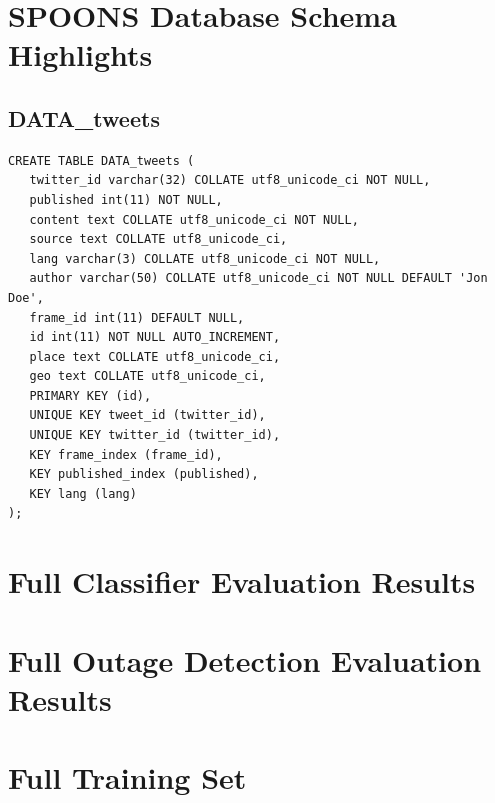 \documentclass[12pt]{ucthesis}
\begin{document}

\appendix
\chapter{SPOONS Database Schema Highlights}
\label{appendix-db-schema}

\section{DATA\_tweets}
\begin{lstlisting}
CREATE TABLE DATA_tweets (
   twitter_id varchar(32) COLLATE utf8_unicode_ci NOT NULL,
   published int(11) NOT NULL,
   content text COLLATE utf8_unicode_ci NOT NULL,
   source text COLLATE utf8_unicode_ci,
   lang varchar(3) COLLATE utf8_unicode_ci NOT NULL,
   author varchar(50) COLLATE utf8_unicode_ci NOT NULL DEFAULT 'Jon Doe',
   frame_id int(11) DEFAULT NULL,
   id int(11) NOT NULL AUTO_INCREMENT,
   place text COLLATE utf8_unicode_ci,
   geo text COLLATE utf8_unicode_ci,
   PRIMARY KEY (id),
   UNIQUE KEY tweet_id (twitter_id),
   UNIQUE KEY twitter_id (twitter_id),
   KEY frame_index (frame_id),
   KEY published_index (published),
   KEY lang (lang)
);
\end{lstlisting}

\chapter{Full Classifier Evaluation Results}
\label{appendix-full-classifier}


\chapter{Full Outage Detection Evaluation Results}
\label{appendix-full-outage-detection}


\chapter{Full Training Set}
\label{appendix-full-training}




\end{document}
